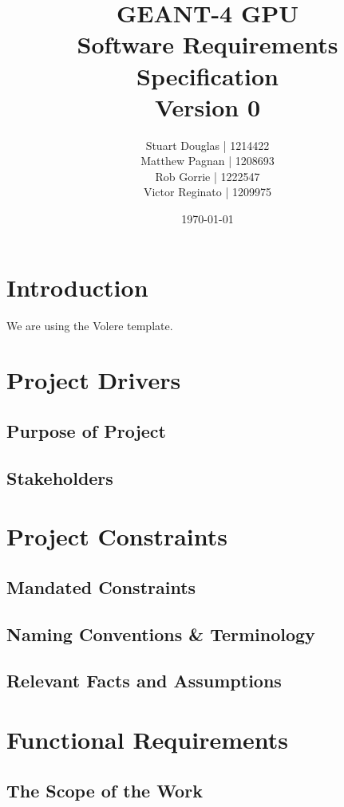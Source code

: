 \documentclass[12pt]{article}
\title{\Huge{GEANT-4 GPU} \LARGE{\\\vspace{7.5mm}\textbf{Software Requirements
 Specification}\\Version 0\vspace{10mm}}}
\author{Stuart Douglas | 1214422\\Matthew Pagnan | 1208693\\Rob Gorrie |
 1222547\\Victor Reginato | 1209975\vspace{10mm}}
\date{\today}
\begin{document}
\maketitle
\newpage

\tableofcontents
\newpage

\section{Introduction}
We are using the Volere template. %

 
\section{Project Drivers}
\subsection{Purpose of Project} %
\subsection{Stakeholders} %

\section{Project Constraints}
\subsection{Mandated Constraints} %
\subsection{Naming Conventions \& Terminology} %
\subsection{Relevant Facts and Assumptions} %

\section{Functional Requirements}
\subsection{The Scope of the Work} %
\end{document}
